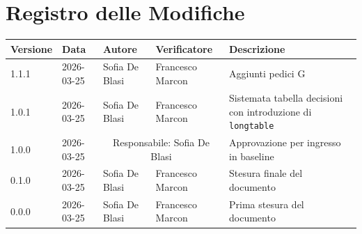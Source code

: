 \section*{Registro delle Modifiche}
\begin{table}[ht]
	\centering
	\renewcommand{\arraystretch}{1.5}
	\begin{tabularx}{\textwidth}{l l l l X}
		\toprule
		\textbf{Versione} & \textbf{Data} & \textbf{Autore} & \textbf{Verificatore} & \textbf{Descrizione} \\
		\midrule
		1.1.1 & 2026-03-25 & Sofia De Blasi & Francesco Marcon & Aggiunti pedici G \\		
		1.0.1 & 2026-03-25 & Sofia De Blasi & Francesco Marcon & Sistemata tabella decisioni con introduzione di \texttt{longtable} \\		
		1.0.0 & 2026-03-25 & \multicolumn{2}{c}{Responsabile: Sofia De Blasi}& Approvazione per ingresso in baseline \\
		0.1.0 & 2026-03-25 & Sofia De Blasi & Francesco Marcon & Stesura finale del documento \\
		0.0.0 & 2026-03-25 & Sofia De Blasi & Francesco Marcon & Prima stesura del documento \\
		\bottomrule
	\end{tabularx}
\end{table}